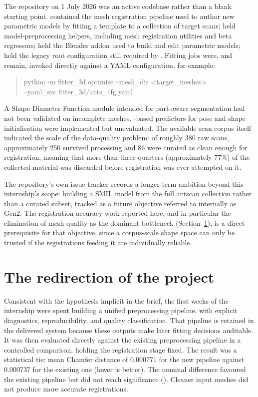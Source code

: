 The repository on 1 July 2026 was an active codebase rather than a blank
starting point.  contained the mesh registration pipeline
used to author new parametric models by fitting a template to a collection of
target  scans;  held model-preprocessing
helpers, including mesh registration utilities and beta regressors;
 held the Blender addon used to build and edit
parametric  models;  held the legacy root
configuration still required by . Fitting jobs were, and
remain, invoked directly against a YAML configuration, for example:
\begin{quote}\small\ttfamily
python -m fitter\_3d.optimise --mesh\_dir <target\_meshes>\\
\hspace*{1em}--yaml\_src fitter\_3d/ants\_cfg.yaml
\end{quote}
A Shape Diameter Function module intended for part-aware segmentation had not
been validated on incomplete meshes. -based predictors for pose
and shape initialisation were implemented but unevaluated. The available scan
corpus itself indicated the scale of the data-quality problem: of roughly 380
raw scans, approximately 250 survived processing and 86 were curated as clean
enough for registration, meaning that more than three-quarters (approximately
77\%) of the collected material was discarded before registration was ever
attempted on it.

The repository's own issue tracker records a longer-term ambition beyond this
internship's scope: building a SMIL model from the full antscan collection
rather than a curated subset, tracked as a future objective referred to
internally as  Gen2. The registration accuracy work reported
here, and in particular the elimination of mesh-quality as the dominant
bottleneck (Section~\ref{sec:turn}), is a direct prerequisite for that objective,
since a corpus-scale shape space can only be trusted if the registrations
feeding it are individually reliable.

\section{The redirection of the project}
\label{sec:turn}

%
Consistent with the hypothesis implicit in the brief, the first weeks of the
internship were spent building a unified preprocessing pipeline, with explicit
diagnostics, reproducibility, and quality classification. That pipeline is
retained in the delivered system because these outputs make later fitting
decisions auditable. It was then evaluated directly against the existing
preprocessing pipeline in a controlled comparison, holding the registration
stage fixed. The result was a statistical tie: mean Chamfer distance of
$0.000771$ for the new pipeline against $0.000737$ for the existing one
(lower is better). The nominal difference favoured the existing pipeline but
did not reach significance (). Cleaner input meshes did not produce more accurate
registrations.


